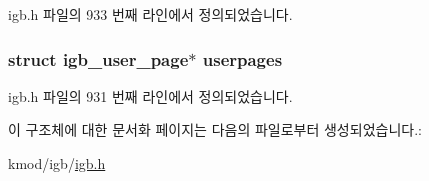 igb.\+h 파일의 933 번째 라인에서 정의되었습니다.

\subsubsection[{\texorpdfstring{userpages}{userpages}}]{\setlength{\rightskip}{0pt plus 5cm}struct {\bf igb\+\_\+user\+\_\+page}$\ast$ userpages}\hypertarget{structigb__private__data_a4699ce469a0376905a64dfccc9999ff6}{}\label{structigb__private__data_a4699ce469a0376905a64dfccc9999ff6}


igb.\+h 파일의 931 번째 라인에서 정의되었습니다.



이 구조체에 대한 문서화 페이지는 다음의 파일로부터 생성되었습니다.\+:\begin{DoxyCompactItemize}
\item 
kmod/igb/\hyperlink{kmod_2igb_2igb_8h}{igb.\+h}\end{DoxyCompactItemize}
